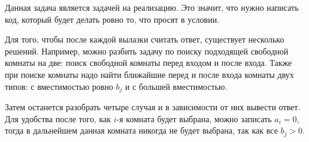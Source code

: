 Данная задача является задачей на реализацию. Это значит, что нужно написать код, который будет делать ровно то, что просят в условии.

Для того, чтобы после каждой вылазки считать ответ, существует несколько решений. Например, можно разбить задачу по поиску подходящей свободной комнаты на две: поиск свободной комнаты перед входом и после входа. Также при поиске комнаты надо найти ближайшие перед и после входа комнаты двух типов: с вместимостью ровно $b_j$ и с большей вместимостью.

Затем останется разобрать четыре случая и в зависимости от них вывести ответ. Для удобства после того, как $i$-я комната будет выбрана, можно записать $a_i = 0$, тогда в дальнейшем данная комната никогда не будет выбрана, так как все $b_j > 0$.